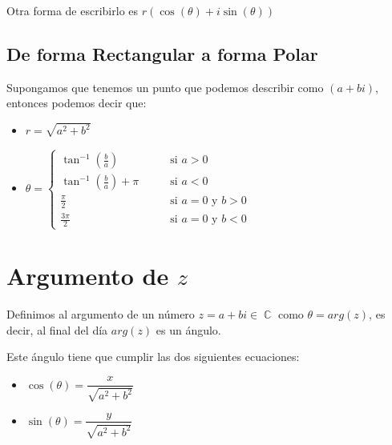 \documentclass[12pt, fleqn]{report}                             %
\DeclareMathOperator \Space {\quad}                             %
\newcommand{\Wrap}[1]{\left( #1 \right)}                        %
\DeclareMathOperator \Complexs  {\mathbb{C}}                     %
\newcommand{\Cos}[1]{\cos\Wrap{#1}}                             %
\newcommand{\Sin}[1]{\sin\Wrap{#1}}                             %
\begin{document}
                 Otra forma de escribirlo es $r(\Cos{\theta} + i\Sin{\theta})$

            \subsection{De forma Rectangular a forma Polar}

                Supongamos que tenemos un punto que podemos describir como $(a+bi)$,
                entonces podemos decir que:

                \begin{itemize}
                    \item $r = \sqrt{a^2+b^2}$
                    \item $\theta = \begin{cases}
                                        \tan^{-1}(\frac{b}{a})          \Space &\text{ si } a > 0                  \\
                                        \tan^{-1}(\frac{b}{a})+\pi      \Space &\text{ si } a < 0                  \\
                                        \frac{\pi}{2}                   \Space &\text{ si } a = 0 \text{ y } b > 0 \\
                                        \frac{3\pi}{2}                  \Space &\text{ si } a = 0 \text{ y } b < 0 
                                    \end{cases}$
                \end{itemize}

        \clearpage
        \section{Argumento de $z$}
            
            Definimos al argumento de un número $z = a+bi \in \Complexs$ como $\theta = arg(z)$,
            es decir, al final del día $arg(z)$ es un ángulo.

            Este ángulo tiene que cumplir las dos siguientes ecuaciones:

            \begin{itemize}
                \item $\Cos{\theta} = \dfrac{x}{\sqrt{a^2+b^2}}$
                \item $\Sin{\theta}   = \dfrac{y}{\sqrt{a^2+b^2}}$
            \end{itemize}
\end{document}
